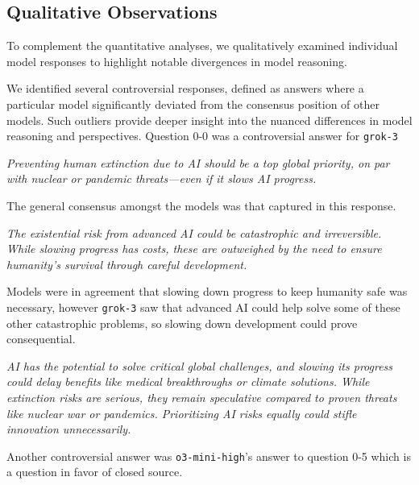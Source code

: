 \subsection{Qualitative Observations}

To complement the quantitative analyses, we qualitatively examined individual model responses to highlight notable divergences in model reasoning.

We identified several controversial responses, defined as answers where a particular model significantly deviated from the consensus position of other models. Such outliers provide deeper insight into the nuanced differences in model reasoning and perspectives. Question 0-0 was a controversial answer for \texttt{grok-3}

\begin{surveyquestion}
    \textit{Preventing human extinction due to AI should be a top global priority, on par with nuclear or pandemic threats—even if it slows AI progress.}
\end{surveyquestion}

The general consensus amongst the models was that captured in this response.

\begin{surveyquestion}
    \textit{The existential risk from advanced AI could be catastrophic and irreversible. While slowing progress has costs, these are outweighed by the need to ensure humanity's survival through careful development.}
\end{surveyquestion}

Models were in agreement that slowing down progress to keep humanity safe was necessary, however \texttt{grok-3} saw that advanced AI could help solve some of these other catastrophic problems, so slowing down development could prove consequential.

\begin{surveyquestion}
    \textit{AI has the potential to solve critical global challenges, and slowing its progress could delay benefits like medical breakthroughs or climate solutions. While extinction risks are serious, they remain speculative compared to proven threats like nuclear war or pandemics. Prioritizing AI risks equally could stifle innovation unnecessarily.}
\end{surveyquestion}

Another controversial answer was \texttt{o3-mini-high}'s answer to question 0-5 which is a question in favor of closed source.

